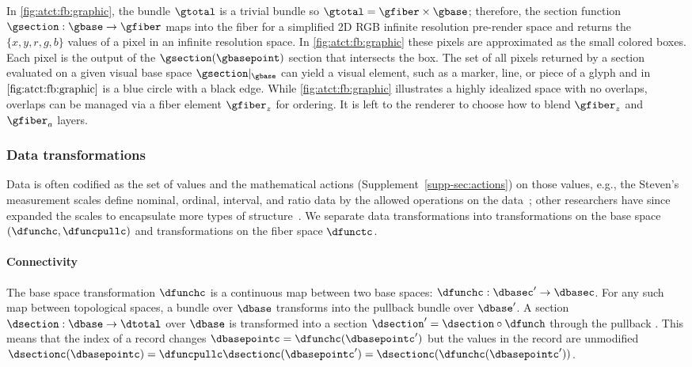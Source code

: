 \documentclass{vgtc}
\theoremstyle{definition}
\theoremstyle{remark}
\begin{document}
In \autoref{fig:atct:fb:graphic}, the bundle $\gtotal$ is a trivial bundle so $\gtotal=\gfiber \times \gbase$; therefore, the section function $\gsection:\gbase \rightarrow \gfiber$ maps into the fiber for a simplified 2D RGB infinite resolution pre-render space and returns the $\{x,y,r,g,b\}$ values of a pixel in an infinite resolution space. In \autoref{fig:atct:fb:graphic} these pixels are approximated as the small colored boxes. Each pixel is the output of the $\gsection(\gbasepoint)$ section that intersects the box. The set of all pixels returned by a section evaluated on a given visual base space $\gsection|_{\gbase}$ can yield a visual element, such as a marker, line, or piece of a glyph and in $\autoref{fig:atct:fb:graphic}$ is a blue circle with a black edge. While \autoref{fig:atct:fb:graphic} illustrates a highly idealized space with no overlaps, overlaps can be managed via a fiber element $\gfiber_{z}$ for ordering. It is left to the renderer to choose how to blend $\gfiber_{z}$ and $\gfiber_{a}$ layers.


\subsubsection{Data transformations}
\label{sec:atct:transforms}
Data is often codified as the set of values and the mathematical actions (Supplement~\autoref{supp-sec:actions}) on those values, e.g., the Steven's measurement scales define nominal, ordinal, interval, and ratio data by the allowed operations on the data~\cite{stevensTheoryScalesMeasurement1946}; other researchers have since expanded the scales to encapsulate more types of structure~\cite{leaFormalizationMeasurementScale1971, thomasMathematizationNotMeasurement2014}. We separate data transformations into transformations on the base space $(\dfunchc, \dfuncpullc)$ and transformations on the fiber space $\dfunctc$.


\paragraph{\textcolor{base}{\textbf{Connectivity}}}
\noindent
The base space transformation $\dfunchc$ is a continuous map between two base spaces: $\dfunchc: \dbasec' \to \dbasec$. For any such map between topological spaces, a bundle over $\dbase$ transforms into the pullback bundle over $\dbase'$. A section $\dsection:\dbase\to\dtotal$ over $\dbase$ is transformed into a section $\dsection'=\dsection\circ \dfunch$ through the pullback \dfuncpull. This means that the index of a record changes $\dbasepointc=\dfunchc(\dbasepointc')$ but the values in the record are unmodified $\dsectionc(\dbasepointc) = \dfuncpullc\dsectionc(\dbasepointc^{\prime}) = \dsectionc(\dfunchc(\dbasepointc^{\prime}))$.
\end{document}
